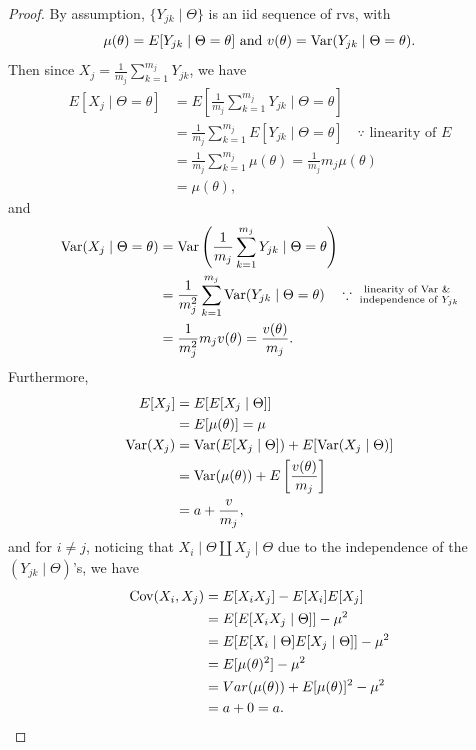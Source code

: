 \documentclass[notoc,notitlepage]{tufte-book}
\begin{document}
\begin{proof}
  By assumption, $\{Y_{jk} \mid \Theta\}$ is an iid sequence of rvs,
  with
  \begin{equation*}
    \mu(\theta) = E[Y_{jk} \mid \Theta = \theta] \text{ and }
    v(\theta) = \operatorname{Var}(Y_{jk} \mid \Theta = \theta).
  \end{equation*}
  Then since $X_j = \frac{1}{m_j} \sum_{k=1}^{m_j} Y_{jk}$, we have
  \begin{align*}
    E[X_j \mid \Theta = \theta]
    &= E \left[ \frac{1}{m_j} \sum_{k=1}^{m_j} Y_{jk}
      \mid \Theta = \theta \right] \\
    &= \frac{1}{m_j} \sum_{k=1}^{m_j} E [ Y_{jk} \mid \Theta = \theta ]
      \quad\because \text{ linearity of } E \\
    &= \frac{1}{m_j} \sum_{k=1}^{m_j} \mu(\theta)
     = \frac{1}{m_j} m_j \mu(\theta) \\
    &= \mu(\theta),
  \end{align*}
  and
  \begin{align*}
    \operatorname{Var}(X_j \mid \Theta = \theta)
    &= \operatorname{Var}\left( \frac{1}{m_j} \sum_{k=1}^{m_j} Y_{jk}
      \mid \Theta = \theta \right) \\
    &= \frac{1}{m_j^2} \sum_{k=1}^{m_j} \operatorname{Var}(Y_{jk} \mid \Theta = \theta)
      \quad\because \substack{\text{linearity of $\operatorname{Var}$ \&} \\
      \text{ independence of } Y_{jk}}  \\
    &= \frac{1}{m_j^2} m_j v(\theta) = \frac{v(\theta)}{m_j}.
  \end{align*}
  Furthermore,
  \begin{align*}
    E[X_j] &= E[E[X_j \mid \Theta]] \\
           &= E[\mu(\theta)] = \mu \\
    \operatorname{Var}(X_j) &= \operatorname{Var}(E[X_j \mid \Theta]) + E[\operatorname{Var}(X_j \mid \Theta)] \\
              &= \operatorname{Var}(\mu(\theta)) + E \left[ \frac{v(\theta)}{m_j} \right] \\
              &= a + \frac{v}{m_j},
  \end{align*}
  and for $i \neq j$, noticing that $X_i \mid \Theta \coprod X_j \mid \Theta$
  due to the independence of the $(Y_{jk} \mid \Theta)$'s, we have
  \begin{align*}
    \operatorname{Cov}(X_i, X_j)
    &= E[X_i X_j] - E[X_i]E[X_j] \\
    &= E[E[X_i X_j \mid \Theta]] - \mu^2 \\
    &= E[E[X_i \mid \Theta] E[X_j \mid \Theta]] - \mu^2 \\
    &= E[\mu(\theta)^2] - \mu^2 \\
    &= Var(\mu(\theta)) + E[\mu(\theta)]^2 - \mu^2 \\
    &= a + 0 = a.
  \end{align*}
\end{proof}
\end{document}

